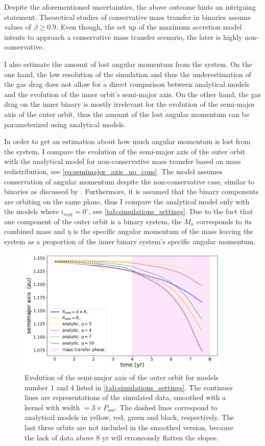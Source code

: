 Despite the aforementioned uncertainties, the above outcome hints an intriguing statement. Theoretical studies of conservative mass transfer in binaries assume values of $\beta \geq 0.9$. Even though, the set up of the maximum accretion model intents to approach a conservative mass transfer scenario, the later is highly non-conservative.

I also estimate the amount of lost angular momentum from the system. On the one hand, the low resolution of the simulation and thus the underestimation of the gas drag does not allow for a direct comparison between analytical models and the evolution of the inner orbit's semi-major axis. On the other hand, the gas drag on the inner binary is mostly irrelevant for the evolution of the semi-major axis of the outer orbit, thus the amount of the lost angular momentum can be parameterized using analytical models.

In order to get an estimation about how much angular momentum is lost from the system, I compare the evolution of the semi-major axis of the outer orbit with the analytical model for non-conservative mass transfer based on mass redistribution, see \cref{eq:semimajor_axis_no_cons}. The model assumes conservation of angular momentum despite the non-conservative case, similar to binaries as discussed by \cite{portegies1995formation}. Furthermore, it is assumed that the binary components are orbiting on the same plane, thus I compare the analytical model only with the models where $i_{mut}=0^{\circ}$, see \cref{tab:simulations_settings}. Due to the fact that one component of the outer orbit is a binary system, the $M_a$ corresponds to its combined mass and $\eta$ is the specific angular momentum of the mass leaving the system as a proportion of the inner binary system's specific angular momentum. 
\begin{figure}[!htb]
    \centering
    \includegraphics[width=0.9\textwidth]{Thesis/graphs/analytical_model.pdf}
    \caption{Evolution of the semi-major axis of the outer orbit for models number 1 and 4 listed in \cref{tab:simulations_settings}. The continues lines are representations of the simulated data, smoothed with a kernel with width $= 3 \times P_{out}$. The dashed lines correspond to analytical models in yellow, red, green and black, respectively.  The last three orbits are not included in the smoothed version, because the lack of data above $8$ yr will erroneously flatten the slopes.}
    \label{fig:comparison_analytical_model_max}
\end{figure}

